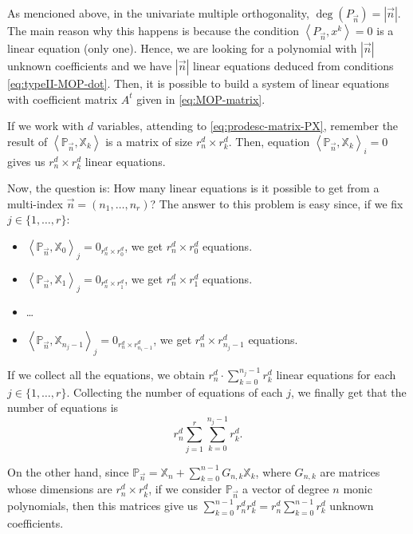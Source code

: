 \documentclass[12pt,a4]{article}
\theoremstyle{plain}
\newcommand{\prodesc}[2]{\left\langle #1 , #2 \right\rangle}
\begin{document}
As mencioned above, in the univariate multiple orthogonality, $\deg(P_{\vec n})=|\vec n|$. The main reason why this happens is because the condition $\prodesc{P_{\vec n}}{x^k}=0$ is a linear equation (only one). Hence, we are looking for a polynomial with $|\vec n|$ unknown coefficients and we have $|\vec n|$ linear equations deduced from conditions \eqref{eq:typeII-MOP-dot}. Then, it is possible to build a system of linear equations with coefficient matrix $A^t$ given in \eqref{eq:MOP-matrix}.

If we work with $d$ variables, attending to \eqref{eq:prodesc-matrix-PX}, remember the result of $\prodesc{\mathbb P_{\vec n}}{\mathbb X_k}$ is a matrix of size $r_n^d\times r_k^d$. Then, equation $\prodesc{\mathbb P_{\vec n}}{\mathbb X_k}_i = 0$ gives us $r_n^d\times r_k^d$ linear equations.

Now, the question is: How many linear equations is it possible to get from a multi-index $\vec n =(n_1, \dots, n_r)$? The answer to this problem is easy since, if we fix $j\in\{1,\dots,r\}$:
\begin{itemize}
    \item $\prodesc{\mathbb P_{\vec n}}{\mathbb X_0}_j = 0_{r^d_n\times r^d_0}$, we get $r^d_n\times r^d_0$ equations.
    \item $\prodesc{\mathbb P_{\vec n}}{\mathbb X_1}_j = 0_{r^d_n\times r^d_1}$, we get $r^d_n\times r^d_1$ equations.
    \item \dots
    \item $\prodesc{\mathbb P_{\vec n}}{\mathbb X_{n_j-1}}_j = 0_{r^d_n\times r^d_{n_i-1}}$, we get $r^d_n\times r^d_{n_j-1}$ equations.
\end{itemize} 
If we collect all the equations, we obtain $r_n^d\cdot\displaystyle\sum_{k=0}^{n_j-1}r^d_k$ linear equations for each $j\in\{1,\dots,r\}$. Collecting the number of equations of each $j$, we finally get that the number of equations is 
\begin{equation}
    \label{eq:number-eqs}
    r_n^d \sum_{j=1}^r \sum_{k=0}^{n_j-1} r_k^d.
\end{equation}

On the other hand, since $\mathbb P_{\vec n} = \mathbb X_n + \displaystyle\sum_{k=0}^{n-1}G_{n,k} \mathbb X_k$, where $G_{n,k}$ are matrices whose dimensions are $r^d_n\times r^d_k$, if we consider $\mathbb P_{\vec n}$ a vector of degree $n$ monic polynomials, then this matrices give us $\displaystyle\sum_{k=0}^{n-1}r^d_n r^d_k=r^d_n\displaystyle\sum_{k=0}^{n-1} r^d_k$ unknown coefficients.
\end{document}
